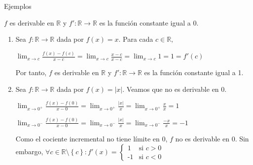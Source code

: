 \documentclass{beamer}
\newcounter{saveenumi}
\newcommand{\seti}{\setcounter{saveenumi}{\value{enumi}}}
\newcommand{\conti}{\setcounter{enumi}{\value{saveenumi}}}
\begin{document}
\begin{frame}
\begin{exampleblock}{Ejemplos}
\begin{center}
$f$ es derivable en $\mathbb{R}$ y $f':\mathbb{R}\rightarrow\mathbb{R}$ es la función constante igual a 0.
\end{center}
\begin{enumerate}
\conti
\item Sea $f:\mathbb{R}\rightarrow\mathbb{R}$ dada por $f(x) = x$. Para cada $c\in{\mathbb{R}},$
\begin{center}
$\displaystyle\lim_{x \to c}\frac{f(x)-f(c)}{x-c} = \displaystyle\lim_{x \to c}\frac{x-c}{x-c} = \displaystyle\lim_{x \to c}1 = 1 = f'(c)$
\end{center}
Por tanto, $f$ es derivable en $\mathbb{R}$ y $f':\mathbb{R}\rightarrow\mathbb{R}$ es la función constante igual a 1.
\item Sea $f:\mathbb{R}\rightarrow\mathbb{R}$ dada por $f(x) = \left|x\right|$. Veamos que no es derivable en 0.
\begin{center}
$\displaystyle\lim_{x \to 0^{+}}\frac{f(x)-f(0)}{x-0} = \displaystyle\lim_{x \to 0^{+}}\frac{\left|x\right|}{x} = \displaystyle\lim_{x \to 0^{+}}\frac{x}{x} = 1$
\end{center}
\begin{center}
$\displaystyle\lim_{x \to 0^{-}}\frac{f(x)-f(0)}{x-0} = \displaystyle\lim_{x \to 0^{-}}\frac{\left|x\right|}{x} = \displaystyle\lim_{x \to 0^{-}}\frac{-x}{x} = -1$
\end{center}
Como el cociente incremental no tiene límite en 0, $f$ no es derivable en 0. Sin embargo, $\forall{c}\in{\mathbb{R}\setminus{\left\{c\right\}}}: f'(x)=
      \begin{cases} 
        \text{1} &\text{si } c>0 \\
        \text{-1} &\text{si } c<0
      \end{cases}$
\seti
\end{enumerate}
\end{exampleblock}
\end{frame}
\end{document}

